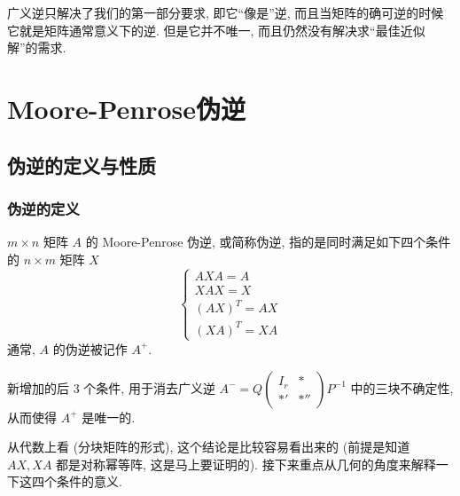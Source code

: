 
\begin{frame}

{
\larger[1]
广义逆只解决了我们的第一部分要求, 即它``像是''逆, 而且当矩阵的确可逆的时候它就是矩阵通常意义下的逆. 但是它并不唯一, 而且仍然没有解决求``最佳近似解''的需求.
}

\end{frame}


\section{Moore-Penrose伪逆}


\subsection{伪逆的定义与性质}


\begin{frame}
\frametitle{伪逆的定义}

\begin{Def}
$m\times n$ 矩阵 $A$ 的 Moore-Penrose 伪逆, 或简称伪逆, 指的是同时满足如下四个条件的 $n\times m$ 矩阵 $X$
\[
\begin{cases}
AXA = A \\
XAX = X \\
(AX)^T = AX \\
(XA)^T = XA
\end{cases}
\]
通常, $A$ 的伪逆被记作 $A^+$.
\end{Def}

\pause
\vspace{0.5em}

\begin{remark}
新增加的后 3 个条件, 用于消去广义逆 $A^- = Q \begin{pmatrix} I_r & * \\ *' & *'' \end{pmatrix} P^{-1}$ 中的三块不确定性, 从而使得 $A^+$ 是唯一的.
\end{remark}
\pause
从代数上看 (分块矩阵的形式), 这个结论是比较容易看出来的 (前提是知道 $AX, XA$ 都是对称幂等阵, 这是马上要证明的). 接下来重点从几何的角度来解释一下这四个条件的意义.

\end{frame}

